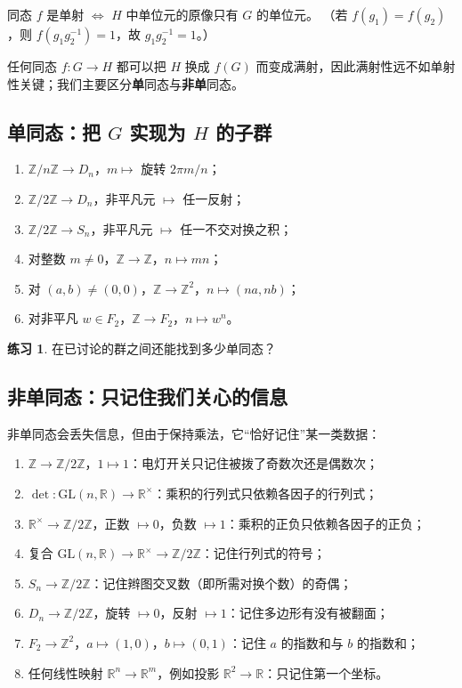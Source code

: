 \documentclass[11pt,a4paper]{article}
\theoremstyle{definition}
\newtheorem{exercise}{练习}
\theoremstyle{plain}
\theoremstyle{remark}
\newcommand{\Z}{\mathbb{Z}}
\newcommand{\R}{\mathbb{R}}
\newcommand{\GL}{\mathrm{GL}}
\begin{document}
\begin{keyidea}[单射判据]
同态 $f$ 是单射 $\iff$ $H$ 中单位元的原像只有 $G$ 的单位元。
（若 $f(g_1)=f(g_2)$，则 $f(g_1g_2^{-1})=1$，故 $g_1g_2^{-1}=1$。）

任何同态 $f:G\to H$ 都可以把 $H$ 换成 $f(G)$ 而变成满射，因此满射性远不如单射性关键；我们主要区分\textbf{单}同态与\textbf{非单}同态。
\end{keyidea}

\subsection{单同态：把 $G$ 实现为 $H$ 的子群}

\begin{enumerate}[nosep]
  \item $\Z/n\Z\to D_n$，$m\mapsto$ 旋转 $2\pi m/n$；
  \item $\Z/2\Z\to D_n$，非平凡元 $\mapsto$ 任一反射；
  \item $\Z/2\Z\to S_n$，非平凡元 $\mapsto$ 任一不交对换之积；
  \item 对整数 $m\ne0$，$\Z\to\Z$，$n\mapsto mn$；
  \item 对 $(a,b)\neq(0,0)$，$\Z\to\Z^2$，$n\mapsto(na,nb)$；
  \item 对非平凡 $w\in F_2$，$\Z\to F_2$，$n\mapsto w^n$。
\end{enumerate}

\begin{exercise}
在已讨论的群之间还能找到多少单同态？
\end{exercise}

\subsection{非单同态：只记住我们关心的信息}

非单同态会丢失信息，但由于保持乘法，它“恰好记住”某一类数据：

\begin{enumerate}[nosep]
  \item $\Z\to\Z/2\Z$，$1\mapsto1$：电灯开关只记住被拨了奇数次还是偶数次；
  \item $\det:\GL(n,\R)\to\R^{\times}$：乘积的行列式只依赖各因子的行列式；
  \item $\R^{\times}\to\Z/2\Z$，正数 $\mapsto0$，负数 $\mapsto1$：乘积的正负只依赖各因子的正负；
  \item 复合 $\GL(n,\R)\to\R^{\times}\to\Z/2\Z$：记住行列式的符号；
  \item $S_n\to\Z/2\Z$：记住辫图交叉数（即所需对换个数）的奇偶；
  \item $D_n\to\Z/2\Z$，旋转 $\mapsto0$，反射 $\mapsto1$：记住多边形有没有被翻面；
  \item $F_2\to\Z^2$，$a\mapsto(1,0)$，$b\mapsto(0,1)$：记住 $a$ 的指数和与 $b$ 的指数和；
  \item 任何线性映射 $\R^n\to\R^m$，例如投影 $\R^2\to\R$：只记住第一个坐标。
\end{enumerate}
\end{document}
